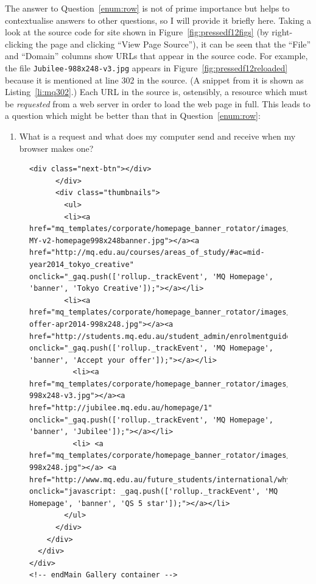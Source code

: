 \documentclass[11pt,a4paper]{report}
\newcommand{\Q}[2]{
	\label{#2}
	\marginpar{\textbf{Q#1.\begin{NoHyper}\ref{#2}\end{NoHyper} }}
}
\newcounter{saveenumi}
\newcommand{\savei}{\setcounter{saveenumi}{\value{enumi}}}
\newcommand{\loadi}{\setcounter{enumi}{\value{saveenumi}}}
\begin{document}
	The answer to Question~\ref{enum:row} is not of prime importance but helps to contextualise answers to other questions, so I will provide it briefly here. Taking a look at the source code for site shown in Figure~\ref{fig:pressedf12figs} (by right-clicking the page and clicking ``View Page Source''), it can be seen that the ``File'' and ``Domain'' columns show URLs that appear in the source code. For example, the file \verb|Jubilee-988x248-v3.jpg| appears in Figure~\ref{fig:pressedf12reloaded} because it is mentioned at line 302 in the source. (A snippet from it is shown as Listing~\ref{li:mq302}.) Each URL in the source is, ostensibly, a resource which must be \textit{requested} from a web server in order to load the web page in full. This leads to a question which might be better than that in Question~\ref{enum:row}:
	\begin{enumerate}
		\loadi
		\item What is a request and what does my computer send and receive when my browser makes one? \Q{2}{enum:request}
		\savei
	\end{enumerate}
	
	\begin{figure}
	\begin{lstlisting}[firstnumber=296, xleftmargin=6.3ex, framexleftmargin=6.3ex, caption=A code snippet showing the source for the home page of Macquarie University., label=li:mq302]
        <div class="next-btn"></div>
      </div>
      <div class="thumbnails">
        <ul>
        <li><a href="mq_templates/corporate/homepage_banner_rotator/images/2014/Tokyo-MY-v2-homepage998x248banner.jpg"></a><a href="http://mq.edu.au/courses/areas_of_study/#ac=mid-year2014_tokyo_creative" onclick="_gaq.push(['rollup._trackEvent', 'MQ Homepage', 'banner', 'Tokyo Creative']);"></a></li>
        <li><a href="mq_templates/corporate/homepage_banner_rotator/images/2014/Accept-offer-apr2014-998x248.jpg"></a><a href="http://students.mq.edu.au/student_admin/enrolmentguide/acceptyouroffer" onclick="_gaq.push(['rollup._trackEvent', 'MQ Homepage', 'banner', 'Accept your offer']);"></a></li>
          <li><a href="mq_templates/corporate/homepage_banner_rotator/images/2014/Jubilee-998x248-v3.jpg"></a><a href="http://jubilee.mq.edu.au/homepage/1" onclick="_gaq.push(['rollup._trackEvent', 'MQ Homepage', 'banner', 'Jubilee']);"></a></li>
          <li> <a href="mq_templates/corporate/homepage_banner_rotator/images/2014/QS5star-998x248.jpg"></a> <a href="http://www.mq.edu.au/future_students/international/why_choose_macquarie/our_reputation/university_rankings/" onclick="javascript: _gaq.push(['rollup._trackEvent', 'MQ Homepage', 'banner', 'QS 5 star']);"></a></li>
        </ul>
      </div>
    </div>
  </div>
</div>
<!-- endMain Gallery container --> 
	\end{lstlisting}
	\end{figure}
	
\end{document}

